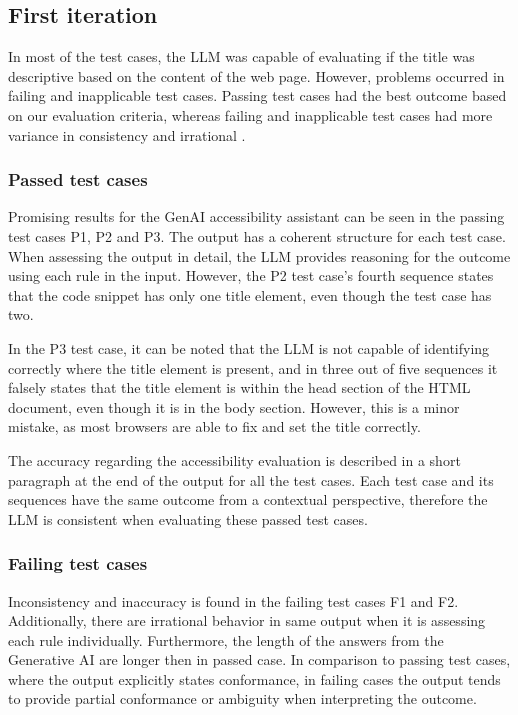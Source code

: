 \subsection{First iteration}

In most of the test cases, the LLM was capable of evaluating if the title was descriptive based on the content of the web page. However, problems occurred in failing and inapplicable test cases. Passing test cases had the best outcome based on our evaluation criteria, whereas failing and inapplicable test cases had more variance in consistency and irrational .

\subsubsection{Passed test cases}

Promising results for the GenAI accessibility assistant can be seen in the passing test cases P1, P2 and P3. The output has a coherent structure for each test case. When assessing the output in detail, the LLM provides reasoning for the outcome using each rule in the input. However, the P2 test case's fourth sequence states that the code snippet has only one title element, even though the test case has two. 

In the P3 test case, it can be noted that the LLM is not capable of identifying correctly where the title element is present, and in three out of five sequences it falsely states that the title element is within the head section of the HTML document, even though it is in the body section. However, this is a minor mistake, as most browsers are able to fix and set the title correctly.

The accuracy regarding the accessibility evaluation is described in a short paragraph at the end of the output for all the test cases. Each test case and its sequences have the same outcome from a contextual perspective, therefore the LLM is consistent when evaluating these passed test cases.

\subsubsection{Failing test cases}

Inconsistency and inaccuracy is found in the failing test cases F1 and F2. Additionally, there are irrational behavior in same output when it is assessing each rule individually. Furthermore, the length of the answers from the Generative AI are longer then in passed case. In comparison to passing test cases, where the output explicitly states conformance, in failing cases the output tends to provide partial conformance or ambiguity when interpreting the outcome. 

